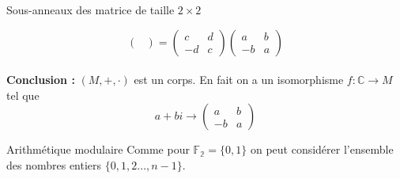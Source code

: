 \begin{parag}{Sous-anneaux des matrice de taille $2 \times 2$}
\begin{enumerate}
\[\begin{pmatrix}
        \end{pmatrix} = \begin{pmatrix}
            c & d \\ -d & c
        \end{pmatrix}\begin{pmatrix}
            a & b \\ -b & a
        \end{pmatrix}\]
        \\
        \textbf{Conclusion : } $(M, +, \cdot)$ est un corps. En fait on a un isomorphisme $f : \mathbb{C} \to M$ tel que 
        \[a + bi \to \begin{pmatrix}
            a & b \\ -b & a
        \end{pmatrix}\]
    \end{enumerate}
\end{parag}
\begin{parag}{Arithmétique modulaire}
    Comme pour $\mathbb{F_2} = \{0,1\}$ on peut considérer l'ensemble des nombres entiers $\{0, 1, 2 \dots, n-1\}$.
\end{parag}